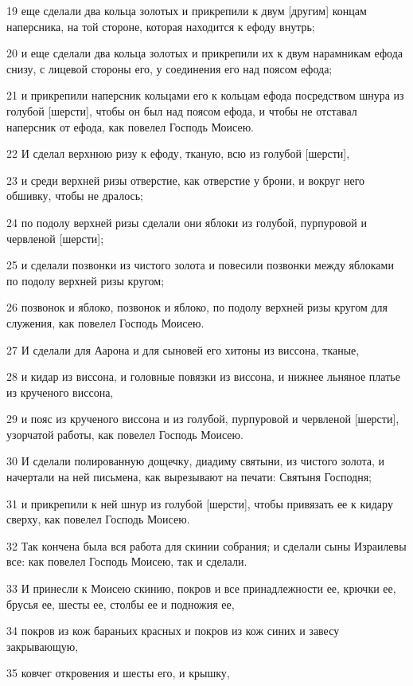 \par 19 еще сделали два кольца золотых и прикрепили к двум [другим] концам наперсника, на той стороне, которая находится к ефоду внутрь;
\par 20 и еще сделали два кольца золотых и прикрепили их к двум нарамникам ефода снизу, с лицевой стороны его, у соединения его над поясом ефода;
\par 21 и прикрепили наперсник кольцами его к кольцам ефода посредством шнура из голубой [шерсти], чтобы он был над поясом ефода, и чтобы не отставал наперсник от ефода, как повелел Господь Моисею.
\par 22 И сделал верхнюю ризу к ефоду, тканую, всю из голубой [шерсти],
\par 23 и среди верхней ризы отверстие, как отверстие у брони, и вокруг него обшивку, чтобы не дралось;
\par 24 по подолу верхней ризы сделали они яблоки из голубой, пурпуровой и червленой [шерсти];
\par 25 и сделали позвонки из чистого золота и повесили позвонки между яблоками по подолу верхней ризы кругом;
\par 26 позвонок и яблоко, позвонок и яблоко, по подолу верхней ризы кругом для служения, как повелел Господь Моисею.
\par 27 И сделали для Аарона и для сыновей его хитоны из виссона, тканые,
\par 28 и кидар из виссона, и головные повязки из виссона, и нижнее льняное платье из крученого виссона,
\par 29 и пояс из крученого виссона и из голубой, пурпуровой и червленой [шерсти], узорчатой работы, как повелел Господь Моисею.
\par 30 И сделали полированную дощечку, диадиму святыни, из чистого золота, и начертали на ней письмена, как вырезывают на печати: Святыня Господня;
\par 31 и прикрепили к ней шнур из голубой [шерсти], чтобы привязать ее к кидару сверху, как повелел Господь Моисею.
\par 32 Так кончена была вся работа для скинии собрания; и сделали сыны Израилевы все: как повелел Господь Моисею, так и сделали.
\par 33 И принесли к Моисею скинию, покров и все принадлежности ее, крючки ее, брусья ее, шесты ее, столбы ее и подножия ее,
\par 34 покров из кож бараньих красных и покров из кож синих и завесу закрывающую,
\par 35 ковчег откровения и шесты его, и крышку,
